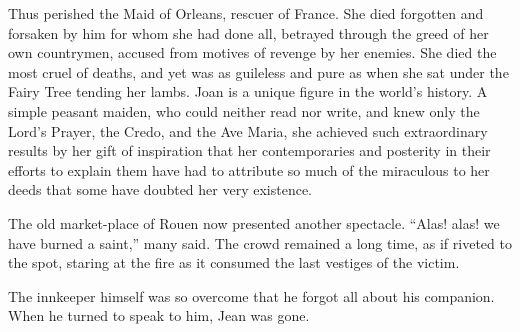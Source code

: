 Thus perished the Maid of Orleans, rescuer of France. She died forgotten
and forsaken by him for whom she had done all, betrayed through the
greed of her own countrymen, accused from motives of revenge by her
enemies. She died the most cruel of deaths, and yet was as guileless and
pure as when she sat under the Fairy Tree tending her lambs. Joan is a
unique figure in the world's history. A simple peasant maiden, who could
neither read nor write, and knew only the Lord's Prayer, the Credo, and
the Ave Maria, she achieved such extraordinary results by her gift of
inspiration that her contemporaries and posterity in their efforts to
explain them have had to attribute so much of the miraculous to her
deeds that some have doubted her very existence.

The old market-place of Rouen now presented another spectacle. ``Alas!
alas! we have burned a saint,'' many said. The crowd remained a long
time, as if riveted to the spot, staring at the fire as it consumed the
last vestiges of the victim.

The innkeeper himself was so overcome that he forgot all about his
companion. When he turned to speak to him, Jean was gone.

\threeast
